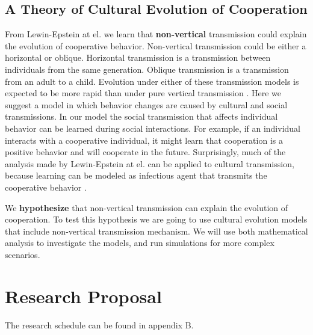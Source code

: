 \documentclass{article}
\begin{document}
\subsection*{A Theory of Cultural Evolution of Cooperation}
From Lewin-Epstein at el. \cite{lewin2017microbes} we learn that \textbf{non-vertical} transmission could explain the evolution of cooperative behavior. 
Non-vertical transmission could be either a horizontal or oblique. Horizontal transmission is a transmission between individuals from the same generation. Oblique transmission is a transmission from an adult to a child. 
Evolution under either of these transmission models is expected to be more rapid than under pure vertical transmission \cite{ram2018evolution}.   
Here we suggest a model in which behavior changes are caused by cultural and social transmissions. In our model the social transmission that affects individual behavior can be learned during social interactions. For example, if an individual interacts with a cooperative individual, it might learn that cooperation is a positive behavior and will cooperate in the future. Surprisingly, much of the analysis made by Lewin-Epstein at el. \cite{lewin2017microbes} can be applied to cultural transmission, because learning can be modeled as infectious agent that transmits the cooperative behavior \cite{cavalli1981cultural}.

We \textbf{hypothesize} that non-vertical transmission can explain the evolution of cooperation. To test this hypothesis we are going to use cultural evolution models that include non-vertical transmission mechanism. We will use both mathematical analysis to investigate the models, and run simulations for more complex scenarios. 



\section*{Research Proposal}
The research schedule can be found in appendix B. 
\end{document}
